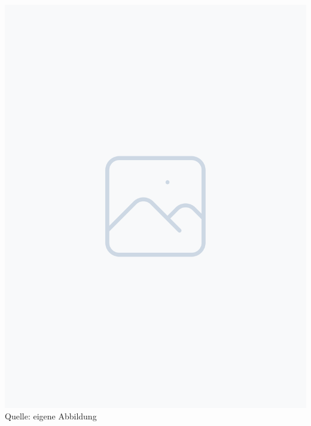 \documentclass[ngerman,12pt,a4paper]{article}
\begin{document}
		\begin{center}
			\begin{minipage}{0.4\textwidth}
				\centering
				\includegraphics[width=\textwidth]{Pictures/placeholder}
				\label{fig:placeholder}
				\vspace{-3pt}
				{\small Quelle: {eigene Abbildung}}
			\end{minipage}
		\end{center}
		
\end{document}
